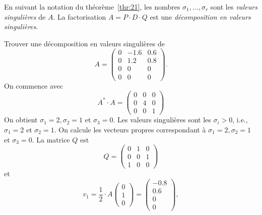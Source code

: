 \begin{definition}
  \label{def:24}
  En suivant la notation du théorème~\ref{thr:21}, 
  les nombres $\sigma_1,\dots,\sigma_r$ sont les \emph{valeurs singulières} de $A$. La factorisation $A = P\cdot D \cdot Q$ est une \emph{décomposition en valeurs singulières}. 
\end{definition}




\begin{example}
  \label{exe:18}
  Trouver une décomposition en valeurs singulières de 
  \begin{displaymath}
    A =
    \begin{pmatrix}
      0 & -1.6  & 0.6 \\
      0 & 1.2 & 0.8 \\
      0 & 0 & 0 \\
      0 & 0 & 0
    \end{pmatrix}. 
  \end{displaymath}
On commence avec 
\begin{displaymath}
  A^* \cdot A =
  \begin{pmatrix}
    0 & 0 & 0 \\
    0 & 4 & 0 \\
    0 & 0 & 1
  \end{pmatrix}
\end{displaymath}
On obtient $\sigma_1 = 2, \sigma_2 = 1$ et $\sigma_3 = 0$. Les valeurs singulières sont les $\sigma_i>0$, i.e., $\sigma_1=2$ et $\sigma_2=1$. On calcule les vecteurs propres correspondant à $\sigma_1 = 2, \sigma_2 = 1$ et $\sigma_3 = 0$. La matrice $Q$ est 
\begin{displaymath}
  Q =
  \begin{pmatrix}
    0 & 1 & 0 \\
    0 & 0 & 1  \\
    1 & 0 & 0  
  \end{pmatrix}
\end{displaymath}
et
\begin{displaymath}
v_1 = \frac{1}{2} \cdot   A 
  \begin{pmatrix}
    0\\1\\0
  \end{pmatrix} =
  \begin{pmatrix}
    -0.8 \\ 0.6 \\ 0 \\ 0
  \end{pmatrix}, 

\end{displaymath}
\end{example}
